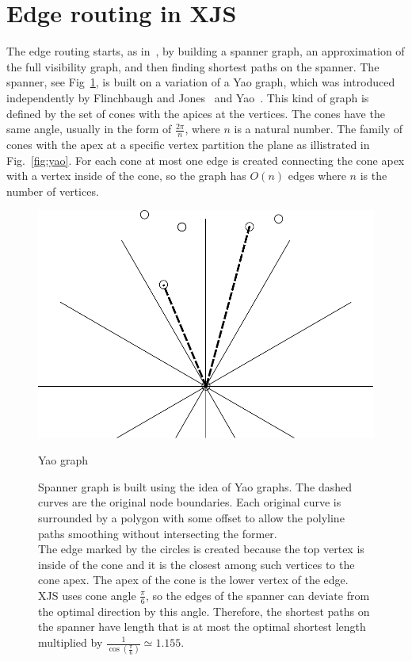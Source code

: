 \documentclass{gd-llncs}
\begin{document}
\section*{Edge routing in XJS}
The edge routing starts, as in~\cite{dwyer2010fast}, by building a spanner graph, an approximation of the full visibility graph, and then finding shortest paths on the spanner. The spanner, see Fig~\ref{fig:spanner}, is built on a variation of a Yao graph, which was introduced independently by Flinchbaugh and Jones~\cite{flinchbaugh1981strong}  and Yao~\cite{yao1982constructing}. This kind of graph is defined by the set of cones with the apices at the vertices. The cones have the same angle,
usually in the form of $\frac{2\pi} {n}$, where $n$ is a natural number.  The family of cones with the apex at a specific vertex partition the plane as illistrated in Fig.~\ref{fig:yao}. For each cone at most one edge is created connecting the cone apex with a vertex inside of the cone, so the graph has $O(n)$ edges where $n$ is the number of vertices. \\
\begin{figure}[]
  \centering
  \begin{minipage}[b]{0.5\textwidth}
    \includegraphics[width=\textwidth]{yao.pdf} 
    \caption{\small{Yao graph}}
    \label{fig:yao}
  \end{minipage}
  \vfill
  \begin{minipage}[b]{\textwidth}
    
    \caption{\small{Spanner graph is built using the idea of Yao graphs. The dashed curves are the original node boundaries. Each original curve is surrounded by a polygon with some offset to allow the polyline paths smoothing without intersecting the former. \\
        The edge marked by the circles is created because the top vertex is inside of the cone and it is the closest among such vertices to the cone apex. The apex of the cone is the lower vertex of the edge. \\XJS uses cone angle $\frac{\pi}{6}$, so the edges of the spanner can deviate from the optimal direction by this angle. Therefore, the shortest paths on the spanner have length that is at most the optimal shortest length multiplied by $\frac{1}{\cos(\frac{\pi}{6})} \simeq 1.155$.}
    }
    \label{fig:spanner}
  \end{minipage}
\end{figure}
\end{document}
